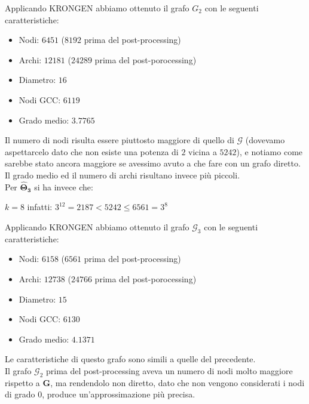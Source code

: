 \documentclass[12pt]{scrartcl}
\begin{document}
Applicando \textsf{KRONGEN} abbiamo ottenuto il grafo $G_2$ con le seguenti caratteristiche:
\begin{itemize}
	\item Nodi: $6451$ ($8192$ prima del post-processing)
	\item Archi: $12181$ ($24289$ prima del post-porocessing)
	\item Diametro: $16$
	\item Nodi GCC: $6119$
	\item Grado medio: $3.7765$
\end{itemize}

Il numero di nodi risulta essere piuttosto maggiore di quello di $\mathcal{G}$ (dovevamo aspettarcelo dato che non esiste una potenza di $2$ vicina a $5242$), e notiamo come sarebbe stato ancora maggiore se avessimo avuto a che fare con un grafo diretto. Il grado medio ed il numero di archi risultano invece più piccoli.\\
Per $\mathbf{\hat{\Theta}_3}$ si ha invece che:

\begin{center}
	$k = 8$ infatti: $3^{12} = 2187 < 5242 \leq 6561 = 3^{8}$
\end{center}

Applicando \textsf{KRONGEN} abbiamo ottenuto il grafo $\mathcal{G}_3$ con le seguenti caratteristiche:

\begin{itemize}
	\item Nodi: $6158$ ($6561$ prima del post-processing)
	\item Archi: $12738$ ($24766$ prima del post-porocessing)
	\item Diametro: $15$
	\item Nodi GCC: $6130$
	\item Grado medio: $4.1371$
\end{itemize}
Le caratteristiche di questo grafo sono simili a quelle del precedente.\\

Il grafo $\mathcal{G}_2$ prima del post-processing aveva un numero di nodi molto maggiore rispetto a $\mathbf{G}$, ma rendendolo non diretto, dato che non vengono considerati i nodi di grado $0$, produce un'approssimazione più precisa.
\end{document}
